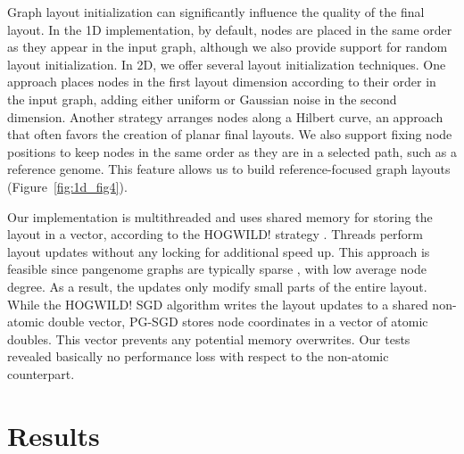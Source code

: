 \documentclass{bioinfo}
\theoremstyle{definition}
\begin{document}
	Graph layout initialization can significantly influence the quality of the final layout.
	In the 1D implementation, by default, nodes are placed in the same order as they appear in the input graph, although we also provide support for random layout initialization.
	In 2D, we offer several layout initialization techniques.
	One approach places nodes in the first layout dimension according to their order in the input graph, adding either uniform or Gaussian noise in the second dimension.
	Another strategy arranges nodes along a Hilbert curve, an approach that often favors the creation of planar final layouts.
	We also support fixing node positions to keep nodes in the same order as they are in a selected path, such as a reference genome.
	This feature allows us to build reference-focused graph layouts (Figure~\ref{fig:1d_fig4}).

	Our implementation is multithreaded and uses shared memory for storing the layout in a vector, according to the HOGWILD! strategy \citep{Recht2011}.
	Threads perform layout updates without any locking for additional speed up.
	This approach is feasible since pangenome graphs are typically sparse \citep{Guarracino2022}, with low average node degree.
	As a result, the updates only modify small parts of the entire layout.
	While the HOGWILD! SGD algorithm writes the layout updates to a shared non-atomic double vector, PG-SGD stores node coordinates in a vector of atomic doubles.
	This vector prevents any potential memory overwrites.
	Our tests revealed basically no performance loss with respect to the non-atomic counterpart.


    \section{Results}
    \label{sec:results}
\end{document}
